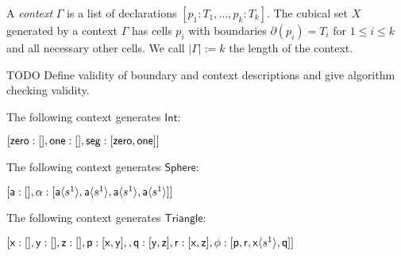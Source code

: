 \documentclass{llncs}
\newcommand{\continuation}{??}
\newenvironment{examplecontd}[1]
{\renewcommand{\continuation}{\ref{#1}}\expcont[continued]}
{\endexpcont}
\newcommand{\todo}[1]{
  \begin{tcolorbox}
    TODO {#1} 
  \end{tcolorbox}
}
\newcommand{\mdef}{:=}
\newcommand{\mname}[1]{\textit{{#1}}}
\newcommand{\mlist}[1]{[ {#1} ]}
\newcommand{\ctxtdim}[1]{|{#1}|}
\newcommand{\smap}[1]{s^{{#1}}}
\newcommand{\cont}[2]{\ensuremath{ \ifthenelse{\equal{#2}{}}{#1}{{#1}\langle{#2}\rangle}} }
\newcommand{\cset}[1]{\ensuremath{\mathsf{{#1}}}}
\newcommand{\boundary}[1]{\partial({#1})}
\newcommand{\substtwo}[2]{\tiny
  \arraycolsep=.4pt\def\arraystretch{1}
  \begin{array}{ll}
    0 &\mapsto {#1} \\
    1 &\mapsto {#2}
  \end{array}
}
\newcommand{\oneconst}{\smap{1}}
\newcommand{\oneid}{\substtwo{0}{1}}
\begin{document}
\begin{definition}
  A \mname{context} $\Gamma$ is a list of declarations $\mlist{ p_1 : T_1 ,
    \ldots , p_k : T_k}$. The cubical set $X$ generated by a context $\Gamma$
  has cells $p_i$ with boundaries $\boundary{p_i} = T_i$ for $1 \leq i \leq k$
  and all necessary other cells. We call $\ctxtdim{\Gamma} \mdef k$ the length
  of the context.
\end{definition}

\todo{Define validity of boundary and context descriptions and give algorithm
  checking validity.
}

\begin{examplecontd}{exp:int}
  The following context generates $\cset{Int}$:
  
  $\mlist{ \cset{zero} : \mlist{} , \cset{one} : \mlist{} , \cset{seg} : \mlist{
      \cont{\cset{zero}}{}, \cont{\cset{one}}{} }}$
\end{examplecontd}

\begin{examplecontd}{exp:sndsphere}
  The following context generates $\cset{Sphere}$:

  $\mlist{ \cset{a} : \mlist{} , \cset{\alpha} : \mlist{ \cont{\cset{a}}{\oneconst} , \cont{\cset{a}}{\oneconst} ,
  \cont{\cset{a}}{\oneconst}, \cont{\cset{a}}{\oneconst} }}$
  
\end{examplecontd}

\begin{examplecontd}{exp:triangle}
  The following context generates $\cset{Triangle}$:
  

  $\mlist{ \cset{x} : \mlist{} , \cset{y} : \mlist{} , \cset{z} : \mlist{} ,
    \cset{p} : \mlist{ \cset{x}, \cset{y}  } ,
    , \cset{q} : \mlist{ \cset{y}, \cset{z} }
    , \cset{r} : \mlist{ \cset{x}, \cset{z} }
    , \cset{\phi} : \mlist{ \cset{p} , \cset{r} ,
      \cont{\cset{x}}{\oneconst}, \cset{q} }
  }$

\end{examplecontd}
\end{document}
